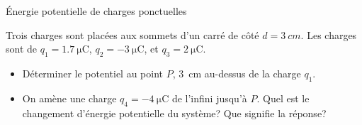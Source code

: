 \documentclass{beamer}
\begin{document}
\begin{frame}{Énergie potentielle de charges ponctuelles}

Trois charges sont placées aux sommets d'un carré de côté $d = \SI{3}{cm}$. Les
charges sont de $q_1 = \SI{1.7}{\micro\coulomb}$, $q_2 = \SI{-3}{\micro\coulomb}$,
et $q_3 = \SI{2}{\micro\coulomb}$.


\begin{itemize}
  \item Déterminer le potentiel au point $P$, \SI{3}{cm} au-dessus de la
    charge $q_1$.
  \item On amène une charge $q_4 = \SI{-4}{\micro\coulomb}$ de l'infini jusqu'à $P$.
    Quel est le changement d'énergie potentielle du système? Que signifie la
    réponse?
\end{itemize}

\begin{center}
\end{center}
\end{frame}
\end{document}
